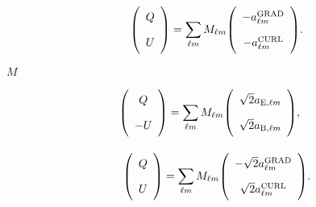\documentclass[12pt,twoside]{article}
\def\lthtmlcheckvsize{\ifdim\ht\sizebox<\vsize 
  \ifdim\wd\sizebox<\hsize\expandafter\hfill\fi \expandafter\vfill
  \else\expandafter\vss\fi}%
\begin{document}
{\newpage\clearpage
{}%
\begin{displaymath}\phantom{1.2}{
\left(
\begin{array}{c} Q \rule[.3cm]{0cm}{.2cm}\rule[-.3cm]{0cm}{.2cm}\\U \rule[.3cm]{0cm}{.2cm}\rule[-.3cm]{0cm}{.2cm}\end{array}
\right)
} = \sum_{\ell m} M_{\ell m} {
\left(
\begin{array}{c} -a_{\ell m}^{\mathrm{GRAD}} \rule[.3cm]{0cm}{.2cm}\rule[-.3cm]{0cm}{.2cm}\\-a_{\ell m}^{\mathrm{CURL}} \rule[.3cm]{0cm}{.2cm}\rule[-.3cm]{0cm}{.2cm}\end{array}
\right)
}.\end{displaymath}%
\lthtmldisplayZ
\lthtmlcheckvsize\clearpage}

{\newpage\clearpage
{}%
$ M$%
\lthtmlindisplaymathZ
\lthtmlcheckvsize\clearpage}

{\newpage\clearpage
{}%
\begin{displaymath}{
\left(
\begin{array}{c} Q \rule[.3cm]{0cm}{.2cm}\rule[-.3cm]{0cm}{.2cm}\\-U \rule[.3cm]{0cm}{.2cm}\rule[-.3cm]{0cm}{.2cm}\end{array}
\right)
} = \sum_{\ell m} M_{\ell m} {
\left(
\begin{array}{c} \sqrt{2}a_{\mathrm{E},\ell m} \rule[.3cm]{0cm}{.2cm}\rule[-.3cm]{0cm}{.2cm}\\\sqrt{2}a_{\mathrm{B},\ell m} \rule[.3cm]{0cm}{.2cm}\rule[-.3cm]{0cm}{.2cm}\end{array}
\right)
},\end{displaymath}%
\lthtmldisplayZ
\lthtmlcheckvsize\clearpage}

{\newpage\clearpage
{}%
\begin{displaymath}\phantom{1.1}{
\left(
\begin{array}{c} Q \rule[.3cm]{0cm}{.2cm}\rule[-.3cm]{0cm}{.2cm}\\U \rule[.3cm]{0cm}{.2cm}\rule[-.3cm]{0cm}{.2cm}\end{array}
\right)
} = \sum_{\ell m} M_{\ell m} {
\left(
\begin{array}{c} -\sqrt{2}a_{\ell m}^{\mathrm{GRAD}} \rule[.3cm]{0cm}{.2cm}\rule[-.3cm]{0cm}{.2cm}\\\sqrt{2}a_{\ell m}^{\mathrm{CURL}} \rule[.3cm]{0cm}{.2cm}\rule[-.3cm]{0cm}{.2cm}\end{array}
\right)
}.\end{displaymath}%
\lthtmldisplayZ
\lthtmlcheckvsize\clearpage}
\end{document}
